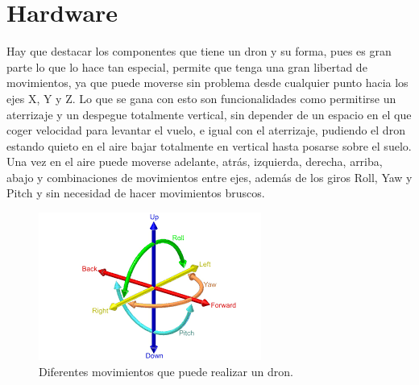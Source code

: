 \section{Hardware}

Hay que destacar los componentes que tiene un dron y su forma, pues es gran parte
lo que lo hace tan especial, permite que tenga una gran libertad de movimientos, ya
que puede moverse sin problema desde cualquier punto hacia los ejes X, Y y Z. Lo
que se gana con esto son funcionalidades como permitirse un aterrizaje y un
despegue totalmente vertical, sin depender de un espacio en el que coger velocidad
para levantar el vuelo, e igual con el aterrizaje, pudiendo el dron estando quieto en
el aire bajar totalmente en vertical hasta posarse sobre el suelo. Una vez en el aire
puede moverse adelante, atrás, izquierda, derecha, arriba, abajo y combinaciones de
movimientos entre ejes, además de los giros Roll, Yaw y Pitch y sin necesidad de hacer
movimientos bruscos.

\begin{figure}[H]
  \centering
  \includegraphics[scale=0.8]{imagenes/pitchRolYaw.png}
  \caption{Diferentes movimientos que puede realizar un dron.}
  \label{fig:gnat}
\end{figure}

